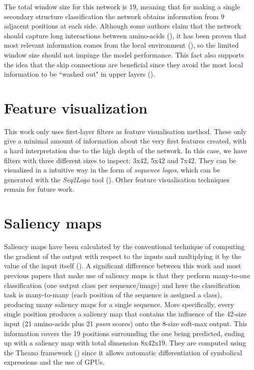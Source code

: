 The total window size for this network is 19, meaning that for making a single secondary structure classification the network obtains information from 9 adjacent positions at each side. Although some authors claim that the network should capture long interactions between amino-acids (\cite{Li2016,Lin2016,Hattori2017,Heffernan2017}), it has been proven that most relevant information comes from the local environment (\cite{Busia2017}), so the limited window size should not impinge the model performance. This fact also supports the idea that the skip connections are beneficial since they avoid the most local information to be ``washed out" in upper layers (\cite{Busia2017}).



\section{Feature visualization}
This work only uses first-layer filters as feature visualisation method. These only give a minimal amount of information about the very first features created, with a hard interpretation due to the high depth of the network. In this case, we have filters with three different sizes to inspect: 3x42, 5x42 and 7x42. They can be visualized in a intuitive way in the form of \textit{sequence logos}, which can be generated with the \textit{Seq2Logo} tool (\cite{Thomsen2012}). Other feature visualisation techniques remain for future work.


\section{Saliency maps} \label{sect:saliency}


Saliency maps have been calculated by the conventional technique of computing the gradient of the output with respect to the inputs and multiplying it by the value of the input itself (\cite{Shrikumar2016}). A significant difference between this work and most previous papers that make use of saliency maps is that they perform many-to-one classification (one output class per sequence/image) and here the classification task is many-to-many (each position of the sequence is assigned a class), producing many saliency maps for a single sequence. More specifically, every single position produces a saliency map that contains the influence of the 42-size input (21 amino-acids plus 21 \textit{pssm} scores) onto the 8-size soft-max output. This information covers the 19 positions surrounding the one being predicted, ending up with a saliency map with total dimension 8x42x19. They are computed using the Theano framework (\cite{TheTheanoDevelopmentTeam2016}) since it allows automatic differentiation of symbolical expressions and the use of GPUs.

